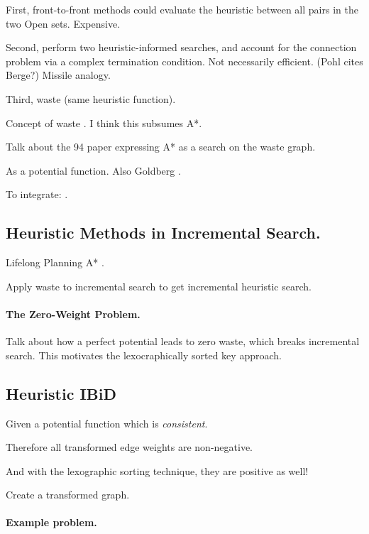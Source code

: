 First,
front-to-front methods
could evaluate the heuristic between all pairs in the two
{\sc Open} sets.
Expensive.

Second,
perform two heuristic-informed searches,
and account for the connection problem via a complex
termination condition.
Not necessarily efficient.
(Pohl cites Berge?)
Missile analogy.

Third,
waste (same heuristic function).

Concept of waste \citep{pohl1969bidirectional}.
I think this subsumes A*.

Talk about the 94 paper \citep{ikeda1994betterroutes}
expressing A* as a search on
the waste graph.

As a potential function.
Also Goldberg \citep{goldberg2005spexternalmemory}.

To integrate: \citep{dechter1984bfsastaropt}.

\subsection{Heuristic Methods in Incremental Search.}

Lifelong Planning A* \citep{koenig2004lpastar}.

Apply waste to incremental search to get
incremental heuristic search.

\paragraph{The Zero-Weight Problem.}
Talk about how a perfect potential leads to zero waste,
which breaks incremental search.
This motivates the lexocraphically sorted key approach.

\subsection{Heuristic IBiD}

Given a potential function which is \emph{consistent}.

Therefore all transformed edge weights are non-negative.

And with the lexographic sorting technique,
they are positive as well!

Create a transformed graph.

\paragraph{Example problem.}

